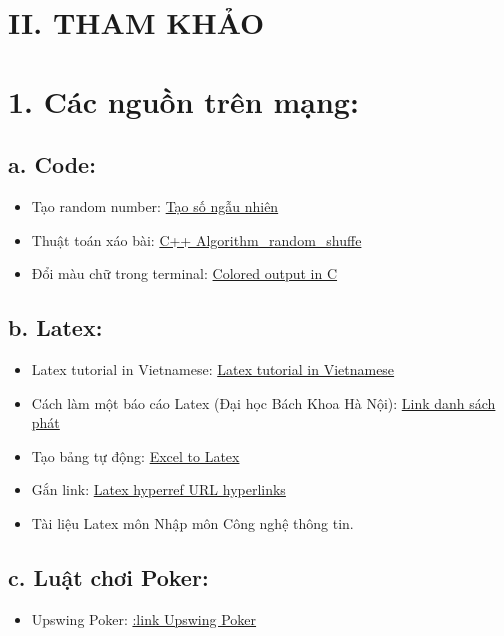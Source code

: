 \documentclass{article}
\begin{document}
\newpage
\vspace{10cm}
\section{II. THAM KHẢO}
\section{1. Các nguồn trên mạng:}
\subsection{a. Code: }
\begin{itemize}
    \item Tạo random number: \href{https://www.w3schools.com/cpp/cpp_howto_random_number.asp}{Tạo số ngẫu nhiên}
    \item Thuật toán xáo bài: \href{https://www.w3schools.com/cpp/ref_algorithm_random_shuffle.asp}{C++ Algorithm\_random\_shuffe}
    \item Đổi màu chữ trong terminal: \href{https://stackoverflow.com/questions/9158150/colored-output-in-c}{Colored output in C}
\end{itemize}
\subsection{b. Latex: }
\begin{itemize}
    \item Latex tutorial in Vietnamese: \href{https://github.com/mh0132345/latex-tutorial?tab=readme-ov-file#ch%C3%A8n-code}{Latex tutorial in Vietnamese}
    \item Cách làm một báo cáo Latex (Đại học Bách Khoa Hà Nội): \href{https://www.youtube.com/watch?v=GVCkD927KMo&list=PLr45c93sdQCKgXoG73h2krsmbtT337f1u}{Link danh sách phát}
    \item Tạo bảng tự động: \href{https://tableconvert.com/excel-to-latex}{Excel to Latex}
    \item Gắn link: \href{https://www.baeldung.com/cs/latex-hyperref-url-hyperlinks}{Latex hyperref URL hyperlinks}
    \item Tài liệu Latex môn Nhập môn Công nghệ thông tin.
\end{itemize}
\subsection{c. Luật chơi Poker:}
\begin{itemize}
    \item Upswing Poker: \href{https://upswingpoker.com/}{:link Upswing Poker}
\end{itemize}
\end{document}
